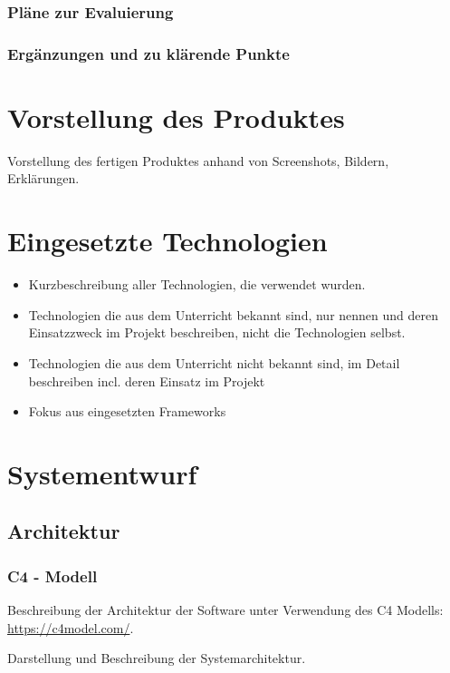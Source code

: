 \subsection{Pläne zur Evaluierung}
\subsection{Ergänzungen und zu klärende Punkte}

\chapter{Vorstellung des Produktes}
Vorstellung des fertigen Produktes anhand von Screenshots, Bildern, Erklärungen.

\chapter{Eingesetzte Technologien}
\begin{itemize}
	\item Kurzbeschreibung aller Technologien, die verwendet wurden.
	\item Technologien die aus dem Unterricht bekannt sind, nur nennen und deren  Einsatzzweck im Projekt beschreiben, nicht die Technologien selbst.
	\item Technologien die aus dem Unterricht nicht bekannt sind, im Detail beschreiben incl. deren Einsatz im Projekt
	\item Fokus aus eingesetzten Frameworks
\end{itemize}

\chapter{Systementwurf}

\section{Architektur}

\subsection{C4 - Modell}

Beschreibung der Architektur der Software unter Verwendung des C4 Modells: \url{https://c4model.com/}.

Darstellung und Beschreibung der Systemarchitektur.

